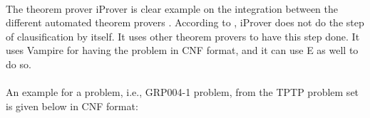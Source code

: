 \paragraph{}
The theorem prover iProver is clear example on the integration between the different automated theorem provers . According to \cite{korovin2013inst}, iProver does not do the step of clausification by itself. It uses other theorem provers to have this step done. It uses Vampire for having the problem in CNF format, and it can use E as well to do so. 

\paragraph{}
An example for a problem, i.e., GRP004-1 problem, from the TPTP problem set is given below in CNF format:

